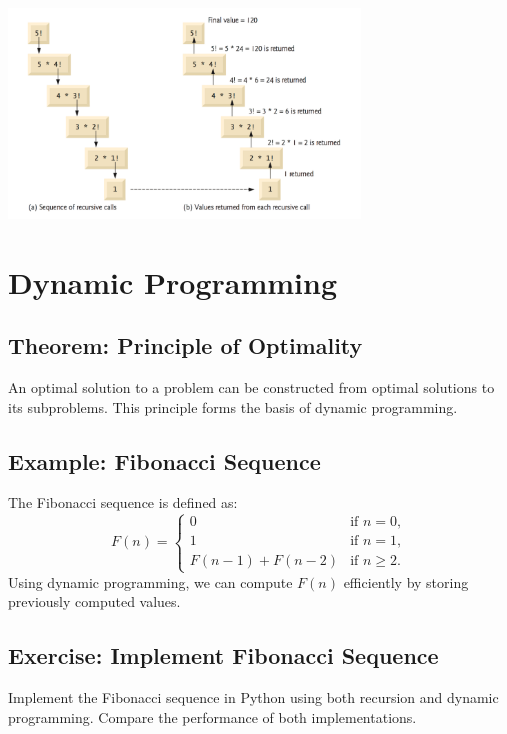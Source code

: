 \begin{example}
    \centering
    \includegraphics[width=0.7\textwidth]{Chapters/ch02/recursion_stack_image.png}  %

\end{example}


\section{Dynamic Programming}

\subsection{Theorem: Principle of Optimality}
\begin{theorem}
An optimal solution to a problem can be constructed from optimal solutions to its subproblems. This principle forms the basis of dynamic programming.
\end{theorem}

\subsection{Example: Fibonacci Sequence}
\begin{example}
The Fibonacci sequence is defined as:
\[
F(n) = \begin{cases}
0 & \text{if } n = 0, \\
1 & \text{if } n = 1, \\
F(n - 1) + F(n - 2) & \text{if } n \geq 2.
\end{cases}
\]
Using dynamic programming, we can compute $F(n)$ efficiently by storing previously computed values.
\end{example}

\subsection{Exercise: Implement Fibonacci Sequence}
\begin{exercise}
Implement the Fibonacci sequence in Python using both recursion and dynamic programming. Compare the performance of both implementations.
\end{exercise}

